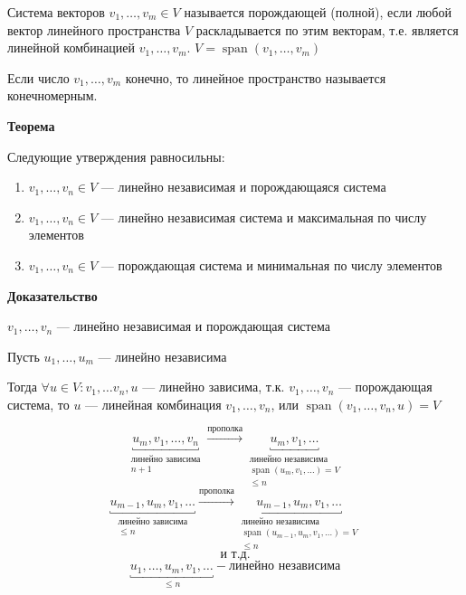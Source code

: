 \documentclass[twoside]{book}
\DeclareMathOperator{\spann}{span}
\begin{document}
Система векторов \(v_1, \ldots, v_m \in V\) называется порождающей (полной), если любой вектор линейного пространства \(V\) раскладывается по этим векторам, т.е. является линейной комбинацией \(v_1, \ldots, v_m\). \(V = \spann (v_1, \ldots, v_m)\)

Если число \(v_1, \ldots, v_m\) конечно, то линейное пространство называется конечномерным.

\textbf{Теорема}

Следующие утверждения равносильны:

\begin{enumerate}
    \item \(v_1, \ldots, v_n \in V\) --- линейно независимая и порождающаяся система

    \item \(v_1, \ldots, v_n \in V\) --- линейно независимая система и максимальная по числу элементов

    \item \(v_1, \ldots, v_n \in V\) --- порождающая система и минимальная по числу элементов
\end{enumerate}

\textbf{Доказательство}

\(v_1, \ldots, v_n\) --- линейно независимая и порождающая система

Пусть \(u_1, \ldots, u_m\) --- линейно независима

Тогда \(\forall u \in V: v_1, \ldots v_n, u\) --- линейно зависима, т.к. \(v_1, \ldots, v_n\) --- порождающая система, то \(u\) --- линейная комбинация \(v_1, \ldots, v_n\), или \(\spann (v_1, \ldots, v_n, u) = V\)

\[
    \underbracket{u_m, v_1, \ldots, v_n}_{\substack{\text{линейно зависима} \\ n + 1}} \xrightarrow{\text{прополка}} \underbracket{u_m, v_1, \ldots}_{\substack{\text{линейно независима} \\ \spann (u_m, v_1, \ldots) = V \\ \le n}}
\]
\[
    \underbracket{u_{m - 1}, u_m, v_1, \ldots}_{\substack{\text{линейно зависима} \\  \le n}} \xrightarrow{\text{прополка}} \underbracket{u_{m - 1}, u_m, v_1, \ldots}_{\substack{\text{линейно независима} \\ \spann (u_{m - 1}, u_m, v_1, \ldots) = V \\ \le n}}
\]
\[\text{и т.д.}\]
\[
    \underbracket{u_1, \ldots, u_m, v_1, \ldots}_{\le n} - \text{линейно независима}
\]
\end{document}
